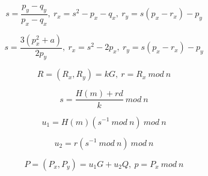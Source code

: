\documentclass{article}
\begin{document}
\[
s = \frac{p_y-q_y}{p_x-q_x},\ 
r_x = s^2-p_x-q_x,\ 
r_y = s(p_x-r_x)-p_y
\]

\[
s = \frac{3(p_x^2+a)}{2p_y},\ 
r_x = s^2-2p_x,\ 
r_y = s(p_x-r_x)-p_y
\]

\[
R = (R_x, R_y) = kG,\ 
r = R_x\ mod\ n
\]

\[
s = \frac{H(m)+rd}{k}\ mod\ n
\]

\[
u_1 = H(m)(s^{-1}\ mod\ n)\ mod\ n
\]

\[
u_2 = r(s^{-1}\ mod\ n)\ mod\ n
\]

\[
P = (P_x, P_y) = u_1 G + u_2 Q,\ p = P_x\ mod\ n
\]
\end{document}
